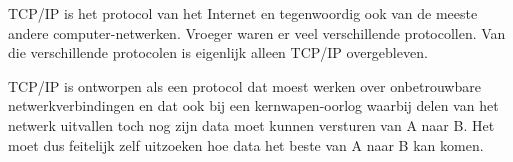 TCP/IP is het protocol van het Internet en tegenwoordig ook van de meeste andere computer-netwerken. Vroeger waren er veel verschillende protocollen. Van die verschillende protocolen is eigenlijk alleen TCP/IP overgebleven.

TCP/IP is ontworpen als een protocol dat moest werken over onbetrouwbare netwerkverbindingen en dat ook bij een kernwapen-oorlog waarbij delen van het netwerk uitvallen toch nog zijn data moet kunnen versturen van A naar B. Het moet dus feitelijk zelf uitzoeken hoe data het beste van A naar B kan komen.

